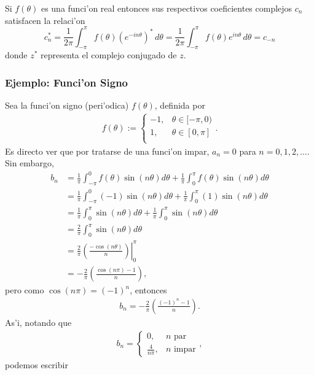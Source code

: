 Si $f(\theta)$ es una funci'on real entonces sus respectivos coeficientes complejos $c_n$ satisfacen la relaci'on
\begin{equation}
c_n^\ast=\frac{1}{2\pi}\int_{-\pi}^\pi f(\theta)(e^{-in\theta})^\ast\,d\theta
=\frac{1}{2\pi}\int_{-\pi}^\pi f(\theta) e^{in\theta}\,d\theta=c_{-n} 
\end{equation}
donde $z^\ast$ representa el complejo conjugado de $z$.

\subsubsection{Ejemplo: Funci'on Signo}
Sea la funci'on signo (peri'odica) $f(\theta)$, definida por 
\begin{align}
f(\theta):=\left\{
\begin{array}{rl}
-1,& \theta \in [-\pi,0)\\
1,& \theta \in [0,\pi]\\
\end{array}\right. .
\end{align}
Es directo ver que por tratarse de una funci'on impar, $a_{n}=0$ para $n=0,1,2,\ldots$. Sin embargo,
\begin{align}
b_{n}&=\frac{1}{\pi}\int_{-\pi}^{0}f(\theta) \sin(n\theta)d\theta+\frac{1}{\pi}\int_{0}^{\pi}f(\theta) \sin(n\theta)d\theta\\
&=\frac{1}{\pi}\int_{-\pi}^{0}(-1) \sin(n\theta)d\theta+\frac{1}{\pi}\int_{0}^{\pi} (1) \sin(n\theta)d\theta\\
&=\frac{1}{\pi}\int_{0}^{\pi} \sin(n\theta)d\theta+\frac{1}{\pi}\int_{0}^{\pi} \sin(n\theta)d\theta\\
&=\frac{2}{\pi}\int_{0}^{\pi}\sin(n\theta)d\theta\\
&=\left.\frac{2}{\pi}\left(\frac{-\cos(n\theta)}{n}\right)\right|_{0}^{\pi}\\
&=-\frac{2}{\pi}\left(\frac{\cos(n\pi)-1}{n}\right),
\end{align}
pero como $\cos(n\pi)=(-1)^{n}$, entonces
\begin{align}
b_{n}=-\frac{2}{\pi}\left(\frac{(-1)^{n}-1}{n}\right).
\end{align}
As'i, notando que
\begin{align}
b_{n}=\left\{
\begin{array}{cl}
0, &n\text{ par}\\
\frac{4}{n \pi}, &n\text{ impar}
\end{array}
\right.,
\end{align}
podemos escribir
